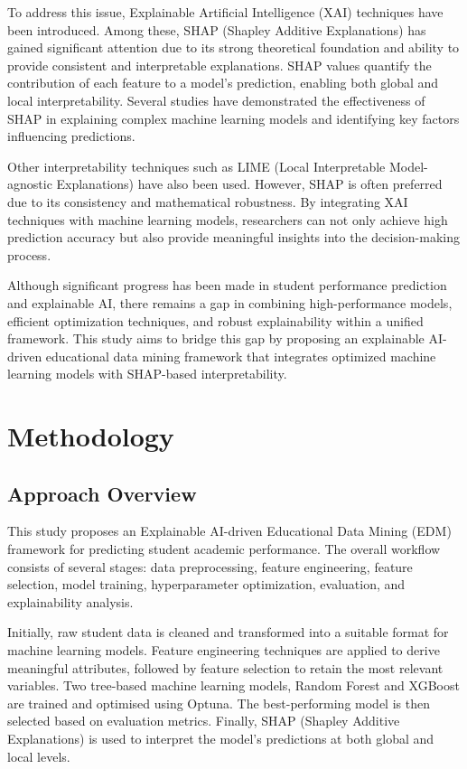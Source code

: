 \documentclass[conference]{IEEEtran}
\begin{document}
To address this issue, Explainable Artificial Intelligence (XAI) techniques have been introduced. Among these, SHAP (Shapley Additive Explanations) has gained significant attention due to its strong theoretical foundation and ability to provide consistent and interpretable explanations. SHAP values quantify the contribution of each feature to a model’s prediction, enabling both global and local interpretability. Several studies have demonstrated the effectiveness of SHAP in explaining complex machine learning models and identifying key factors influencing predictions. 

Other interpretability techniques such as LIME (Local Interpretable Model-agnostic Explanations) have also been used. However, SHAP is often preferred due to its consistency and mathematical robustness. By integrating XAI techniques with machine learning models, researchers can not only achieve high prediction accuracy but also provide meaningful insights into the decision-making process. 

Although significant progress has been made in student performance prediction and explainable AI, there remains a gap in combining high-performance models, efficient optimization techniques, and robust explainability within a unified framework. This study aims to bridge this gap by proposing an explainable AI-driven educational data mining framework that integrates optimized machine learning models with SHAP-based interpretability. 

\section{Methodology}
\subsection{Approach Overview}
This study proposes an Explainable AI-driven Educational Data Mining (EDM) framework for predicting student academic performance. The overall workflow consists of several stages: data preprocessing, feature engineering, feature selection, model training, hyperparameter optimization, evaluation, and explainability analysis. 

Initially, raw student data is cleaned and transformed into a suitable format for machine learning models. Feature engineering techniques are applied to derive meaningful attributes, followed by feature selection to retain the most relevant variables. Two tree-based machine learning models, Random Forest and XGBoost are trained and optimised using Optuna. The best-performing model is then selected based on evaluation metrics. Finally, SHAP (Shapley Additive Explanations) is used to interpret the model’s predictions at both global and local levels. 
\end{document}
